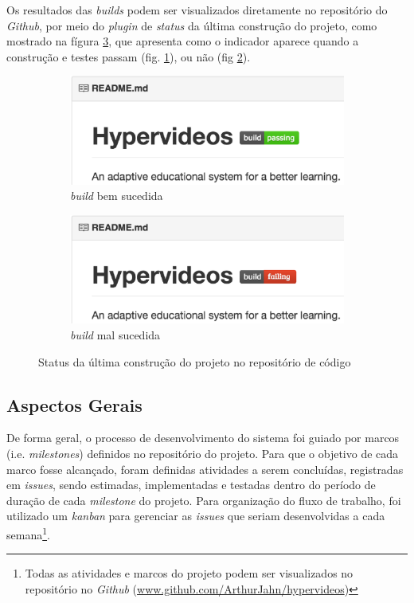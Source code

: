 Os resultados das \textit{builds} podem ser visualizados diretamente no repositório do \textit{Github}, por meio do \textit{plugin} de \textit{status} da última construção do projeto, como mostrado na fígura \ref{fig:status}, que apresenta como o indicador aparece quando a construção e testes passam (fig. \ref{fig:status_a}), ou não (fig \ref{fig:status_b}).

\begin{figure}[h!]
  	\centering
  	\begin{subfigure}{.4\textwidth}
  		\centering
  		\includegraphics[width=.9\linewidth]{figuras/build_passing.eps}
  		\caption{\textit{build} bem sucedida}
  		\label{fig:status_a}
	\end{subfigure}%
	\begin{subfigure}{.4\textwidth}
  		\centering
  		\includegraphics[width=.9\linewidth]{figuras/build_failure.eps}
		\caption{\textit{build} mal sucedida}
  		\label{fig:status_b}
	\end{subfigure}%
  	\caption{Status da última construção do projeto no repositório de código}
  	\label{fig:status}
\end{figure}
 
\subsection{Aspectos Gerais} 

De forma geral, o processo de desenvolvimento do sistema foi guiado por marcos (i.e. \textit{milestones}) definidos no repositório do projeto. Para que o objetivo de cada marco fosse alcançado, foram definidas atividades a serem concluídas, registradas em \textit{issues}, sendo estimadas, implementadas e testadas dentro do período de duração de cada \textit{milestone} do projeto. Para organização do fluxo de trabalho, foi utilizado um \textit{kanban} para gerenciar as \textit{issues} que seriam desenvolvidas a cada semana\footnote{ Todas as atividades e marcos do projeto podem ser visualizados no repositório no \textit{Github} (\url{www.github.com/ArthurJahn/hypervideos})}.


